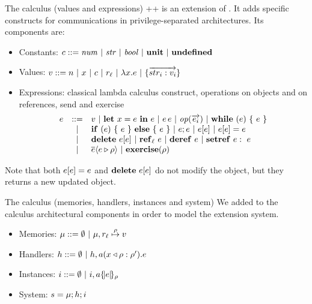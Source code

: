 \documentclass[11pt]{beamer}
\begin{document}
\begin{frame}{The calculus (values and expressions)}
\ljs++ is an extension of \ljs. It adds specific constructs for communications in privilege-separated architectures. Its components are:

\begin{itemize}
\item Constants: $c ::= \mathit{num} ~|~ \mathit{str} ~|~ \mathit{bool} ~|~ \unit ~|~ \undef$
\item Values: $v ::= n ~|~ x ~|~ c ~|~ r_{\ell} ~|~ \lam{x}{e} ~|~ \rec{\vec{str_i:v_i}}$
\item Expressions: classical lambda calculus construct, operations on objects and on references, send and exercise
$$
\begin{array}{ccl}
e & ::= & v ~|~ \letexpr{x}{e}{e} ~|~ \appl{e}{e} ~|~ \op(\vec{e_i}) ~|~ \while{e}{e}\\
& | & \cond{e}{e}{e} ~|~  e;e ~|~ \lookup{e}{e} ~|~ \store{e}{e}{e} \\
& | & \delete{e}{e} ~|~ \newref{\ell}{e} ~|~ \deref{e} ~|~ \setref{e}{e} \\
& | & \send{e}{e}{\rho} ~|~ \exercise{\rho}
\end{array}$$
\end{itemize}
Note that both $\store{e}{e}{e}$ and $\delete{e}{e}$ do not modify the object, but they returns a new updated object.
\end{frame}

\begin{frame}{The calculus (memories, handlers, instances and system)}
We added to the calculus architectural components in order to model the extension system.
\begin{itemize}
\item Memories: $\mu ::= \emptyset ~|~ \mu, \map{r_{\ell}}{\rho}{v}$
\item Handlers: $h ::= \emptyset ~|~ h,\handler{a}{x}{\rho}{e}{\rho'}$
\item Instances: $i ::= \emptyset ~|~ i,\inst{a}{e}{\rho}$
\item System: $s = \sys{\mu}{h}{i}$
\end{itemize}
\end{frame}
\end{document}
